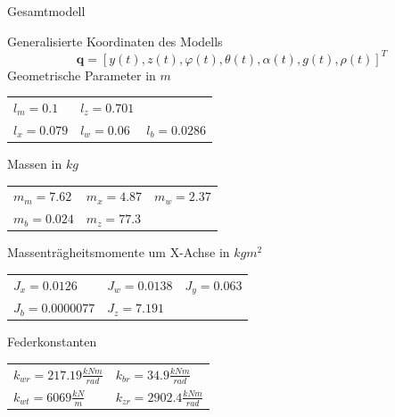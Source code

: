 \documentclass[10pt,xcolor=dvipsnames]{beamer}
\begin{document}
		\begin{frame}{Gesamtmodell}
		\begin{minipage}{0.58\textwidth}
			Generalisierte Koordinaten des Modells
			\[ \bm{q} = [y(t), z(t), \varphi(t), \theta(t), \alpha(t), g(t), \rho(t)]^{T} \]
			Geometrische Parameter in $ m $\\\vspace{10pt} \def\arraystretch{1.2}
			\begin{tabular}{lll}
				$ l_{m}=0.1 $ & $ l_{z}=0.701 $ &  \\ 
				$ l_{x}=0.079 $ & $ l_{w}=0.06 $ & $ l_{b}=0.0286 $\\
			\end{tabular}
			Massen in $ kg $\\\vspace{10pt} \def\arraystretch{1.2}
			\begin{tabular}{lll}
				$ m_{m}=7.62 $ & $ m_{x}=4.87 $ & $ m_{w}=2.37 $   \\ 
				$ m_{b}=0.024 $ & $ m_{z} = 77.3 $ &\\
			\end{tabular}
			Massenträgheitsmomente um X-Achse in $ kgm^{2} $\\\vspace{10pt} \def\arraystretch{1.2}
			\begin{tabular}{lll}
				$ J_{x}=0.0126 $ & $ J_{w}=0.0138 $ & $ J_{y} = 0.063 $ \\ 
				$ J_{b}=0.0000077 $  & $ J_{z}=7.191 $&  \\
			\end{tabular}
			Federkonstanten\\\vspace{10pt} \def\arraystretch{1.3}
			\begin{tabular}{ll}
				$ k_{wr}=217.19\frac{kNm}{rad} $ & $ k_{br}=34.9\frac{kNm}{rad} $ \\ 
				$ k_{wt}=6069\frac{kN}{m} $ & $ k_{zr}=2902.4\frac{kNm}{rad} $ \\   
			\end{tabular}
		\end{minipage}
		\hfill
		\begin{minipage}{0.38\textwidth}
			\begin{figure}

\end{figure}
\end{minipage}
\end{frame}
\end{document}
